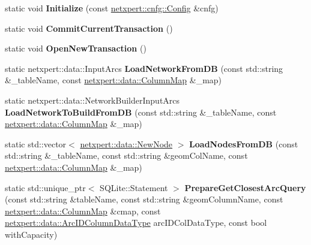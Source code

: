\begin{DoxyCompactItemize}
\item 
static void {\bfseries Initialize} (const \hyperlink{structnetxpert_1_1cnfg_1_1Config}{netxpert\+::cnfg\+::\+Config} \&cnfg)\hypertarget{classnetxpert_1_1io_1_1DBHELPER_a091b1da6ebcbb415f633383ce9f3732e}{}\label{classnetxpert_1_1io_1_1DBHELPER_a091b1da6ebcbb415f633383ce9f3732e}

\item 
static void {\bfseries Commit\+Current\+Transaction} ()\hypertarget{classnetxpert_1_1io_1_1DBHELPER_ac6f26d9cd75b7425606193cd94cd8ce0}{}\label{classnetxpert_1_1io_1_1DBHELPER_ac6f26d9cd75b7425606193cd94cd8ce0}

\item 
static void {\bfseries Open\+New\+Transaction} ()\hypertarget{classnetxpert_1_1io_1_1DBHELPER_ab0f5e0871bfe5ccf43eacc467ba1d1e5}{}\label{classnetxpert_1_1io_1_1DBHELPER_ab0f5e0871bfe5ccf43eacc467ba1d1e5}

\item 
static netxpert\+::data\+::\+Input\+Arcs {\bfseries Load\+Network\+From\+DB} (const std\+::string \&\+\_\+table\+Name, const \hyperlink{structnetxpert_1_1data_1_1ColumnMap}{netxpert\+::data\+::\+Column\+Map} \&\+\_\+map)\hypertarget{classnetxpert_1_1io_1_1DBHELPER_adea7317655d98165addf32ca98246e55}{}\label{classnetxpert_1_1io_1_1DBHELPER_adea7317655d98165addf32ca98246e55}

\item 
static netxpert\+::data\+::\+Network\+Builder\+Input\+Arcs {\bfseries Load\+Network\+To\+Build\+From\+DB} (const std\+::string \&\+\_\+table\+Name, const \hyperlink{structnetxpert_1_1data_1_1ColumnMap}{netxpert\+::data\+::\+Column\+Map} \&\+\_\+map)\hypertarget{classnetxpert_1_1io_1_1DBHELPER_ae2938be0a57e275a376ddad51ea0561f}{}\label{classnetxpert_1_1io_1_1DBHELPER_ae2938be0a57e275a376ddad51ea0561f}

\item 
static std\+::vector$<$ \hyperlink{structnetxpert_1_1data_1_1NewNode}{netxpert\+::data\+::\+New\+Node} $>$ {\bfseries Load\+Nodes\+From\+DB} (const std\+::string \&\+\_\+table\+Name, const std\+::string \&geom\+Col\+Name, const \hyperlink{structnetxpert_1_1data_1_1ColumnMap}{netxpert\+::data\+::\+Column\+Map} \&\+\_\+map)\hypertarget{classnetxpert_1_1io_1_1DBHELPER_a81a4919efc4dc8d35bb2ba47ae55da25}{}\label{classnetxpert_1_1io_1_1DBHELPER_a81a4919efc4dc8d35bb2ba47ae55da25}

\item 
static std\+::unique\+\_\+ptr$<$ S\+Q\+Lite\+::\+Statement $>$ {\bfseries Prepare\+Get\+Closest\+Arc\+Query} (const std\+::string \&table\+Name, const std\+::string \&geom\+Column\+Name, const \hyperlink{structnetxpert_1_1data_1_1ColumnMap}{netxpert\+::data\+::\+Column\+Map} \&cmap, const \hyperlink{namespacenetxpert_1_1data_a7f0e5c814a8a55ea94f348b10826e206}{netxpert\+::data\+::\+Arc\+I\+D\+Column\+Data\+Type} arc\+I\+D\+Col\+Data\+Type, const bool with\+Capacity)\hypertarget{classnetxpert_1_1io_1_1DBHELPER_afeea6c99ff55007ab5079c75c39bd4c6}{}\label{classnetxpert_1_1io_1_1DBHELPER_afeea6c99ff55007ab5079c75c39bd4c6}


\end{DoxyCompactItemize}
